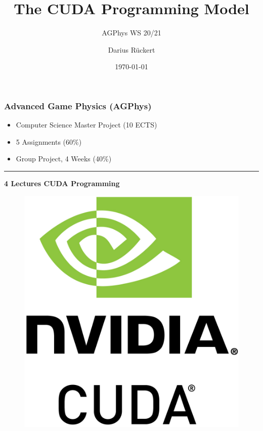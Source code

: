 \documentclass[aspectratio=169]{beamer}
\title{The CUDA Programming Model}
\subtitle{AGPhys WS 20/21}
\author[Darius Rückert]{Darius Rückert}
\date{\today}
\begin{document}
\frame
{
	\titlepage
}

\begin{frame}[fragile]
\frametitle{Advanced Game Physics (AGPhys)}
\begin{itemize}
\item Computer Science Master Project (10 ECTS)
\item 5 Assignments (60\%)
\item Group Project, 4 Weeks (40\%)
\end{itemize}
\hrule
\vspace{0.5cm}

\begin{minipage}{0.48\linewidth}

\centering
	\textbf{4 Lectures CUDA Programming}
	\begin{figure}
\includegraphics[height=.35\textheight]{cuda}
	\end{figure}


\end{minipage}
\end{frame}
\end{document}
